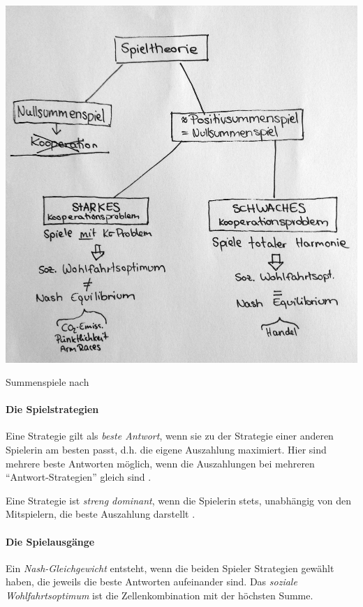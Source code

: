 \begin{dsafigure}
	\begin{center}
	\includegraphics[width=0.9\columnwidth]{img/summenspiele.jpg}
	\caption{Summenspiele nach \cite{Kleinberg-2009-oz}}
	\label{fig:gefangenendilemma}
	\end{center}
\end{dsafigure}


\paragraph{Die Spielstrategien}

Eine Strategie gilt als \emph{beste Antwort}, wenn sie zu der Strategie einer anderen Spielerin am besten passt, d.h. die eigene Auszahlung maximiert.
Hier sind mehrere beste Antworten möglich, wenn die Auszahlungen bei mehreren ``Antwort-Strategien'' gleich sind \parencite[vgl.][153]{Kleinberg-2009-oz}.

Eine Strategie ist \emph{streng dominant}, wenn die Spielerin stets, unabhängig von den Mitspielern, die beste Auszahlung darstellt \parencite[vgl.][164]{Kleinberg-2009-oz}.


\paragraph{Die Spielausgänge}

Ein \emph{Nash-Gleichgewicht} entsteht, wenn die beiden Spieler Strategien gewählt haben, die jeweils die beste Antworten aufeinander sind.
Das \emph{soziale Wohlfahrtsoptimum} ist die Zellenkombination mit der höchsten Summe.

